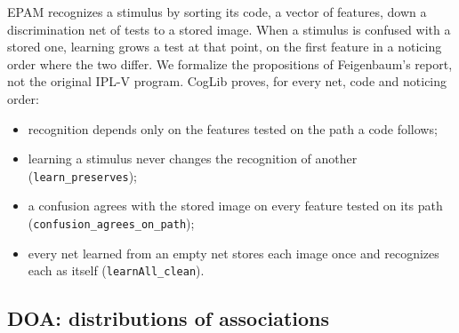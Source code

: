 \documentclass[11pt]{article}
\newcommand{\lean}[1]{\texttt{#1}}
\begin{document}
EPAM \citep{feigenbaum1959,feigenbaum1962} recognizes a stimulus by sorting its code, a vector of features, down a discrimination net of tests to a stored image. When a stimulus is confused with a stored one, learning grows a test at that point, on the first feature in a noticing order where the two differ. We formalize the propositions of Feigenbaum's report, not the original IPL-V program. CogLib proves, for every net, code and noticing order:
\begin{itemize}
  \item recognition depends only on the features tested on the path a code follows;
  \item learning a stimulus never changes the recognition of another (\lean{learn\_preserves});
  \item a confusion agrees with the stored image on every feature tested on its path (\lean{confusion\_agrees\_on\_path});
  \item every net learned from an empty net stores each image once and recognizes each as itself (\lean{learnAll\_clean}).
\end{itemize}

\subsection{DOA: distributions of associations}
\end{document}
